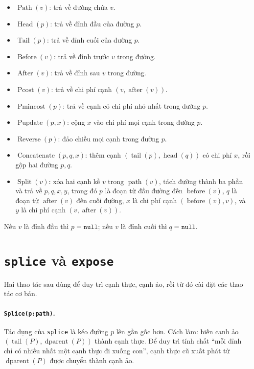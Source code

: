 \documentclass[11pt]{article}
\begin{document}
\begin{itemize}
  \item \(\operatorname{Path}(v)\): trả về đường chứa \(v\).
  \item \(\operatorname{Head}(p)\): trả về đỉnh đầu của đường \(p\).
  \item \(\operatorname{Tail}(p)\): trả về đỉnh cuối của đường \(p\).
  \item \(\operatorname{Before}(v)\): trả về đỉnh trước \(v\) trong đường.
  \item \(\operatorname{After}(v)\): trả về đỉnh sau \(v\) trong đường.
  \item \(\operatorname{Pcost}(v)\): trả về chi phí cạnh
  \((v,\operatorname{after}(v))\).
  \item \(\operatorname{Pmincost}(p)\): trả về cạnh có chi phí nhỏ nhất trong
  đường \(p\).
  \item \(\operatorname{Pupdate}(p,x)\): cộng \(x\) vào chi phí mọi cạnh trong
  đường \(p\).
  \item \(\operatorname{Reverse}(p)\): đảo chiều mọi cạnh trong đường \(p\).
  \item \(\operatorname{Concatenate}(p,q,x)\): thêm cạnh
  \((\operatorname{tail}(p),\operatorname{head}(q))\) có chi phí \(x\), rồi
  gộp hai đường \(p,q\).
  \item \(\operatorname{Split}(v)\): xóa hai cạnh kề \(v\) trong
  \(\operatorname{path}(v)\), tách đường thành ba phần và trả về
  \(p,q,x,y\), trong đó \(p\) là đoạn từ đầu đường đến
  \(\operatorname{before}(v)\), \(q\) là đoạn từ \(\operatorname{after}(v)\)
  đến cuối đường, \(x\) là chi phí cạnh \((\operatorname{before}(v),v)\), và
  \(y\) là chi phí cạnh \((v,\operatorname{after}(v))\).
\end{itemize}

Nếu \(v\) là đỉnh đầu thì \(p=\texttt{null}\); nếu \(v\) là đỉnh cuối thì
\(q=\texttt{null}\).

\section{\texttt{splice} và \texttt{expose}}

Hai thao tác sau dùng để duy trì cạnh thực, cạnh ảo, rồi từ đó cài đặt các
thao tác cơ bản.

\paragraph{\texttt{Splice(p:path)}.}
Tác dụng của \texttt{splice} là kéo đường \(p\) lên gần gốc hơn. Cách làm:
biến cạnh ảo \((\operatorname{tail}(P),\operatorname{dparent}(P))\) thành
cạnh thực. Để duy trì tính chất ``mỗi đỉnh chỉ có nhiều nhất một cạnh thực đi
xuống con'', cạnh thực cũ xuất phát từ \(\operatorname{dparent}(P)\) được
chuyển thành cạnh ảo.
\end{document}
